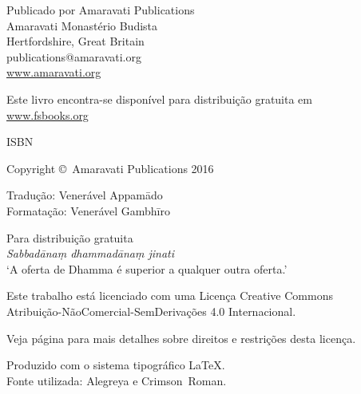\cleartoverso
\thispagestyle{empty}

{\copyrightsize
\centering
\setlength{\parindent}{0pt}%
\setlength{\parskip}{0.8\baselineskip}%

\thetitle

Publicado por Amaravati Publications\\
Amaravati Monastério Budista\\
Hertfordshire, Great Britain\\
publications@amaravati.org\\
\href{http://amaravati.org}{www.amaravati.org}

Este livro encontra-se disponível para distribuição gratuita em\\
\href{http://fsbooks.org/}{www.fsbooks.org}

ISBN \theISBN

Copyright \copyright\ Amaravati Publications 2016


Tradução: Venerável Appamādo\\
Formatação: Venerável Gambhīro

\vfill

{\footnotesize

Para distribuição gratuita\\
\textit{Sabbadānaṃ dhammadānaṃ jinati}\\
‘A oferta de Dhamma é superior a qualquer outra oferta.’

Este trabalho está licenciado com uma Licença Creative Commons\\
Atribuição-NãoComercial-SemDerivações 4.0 Internacional.

Veja página \pageref{copyright-details} para mais detalhes sobre direitos e restrições desta licença.

Produzido com o sistema tipográfico \LaTeX.\\
Fonte utilizada: Alegreya e Crimson~Roman.

\theEditionInfo

}}
